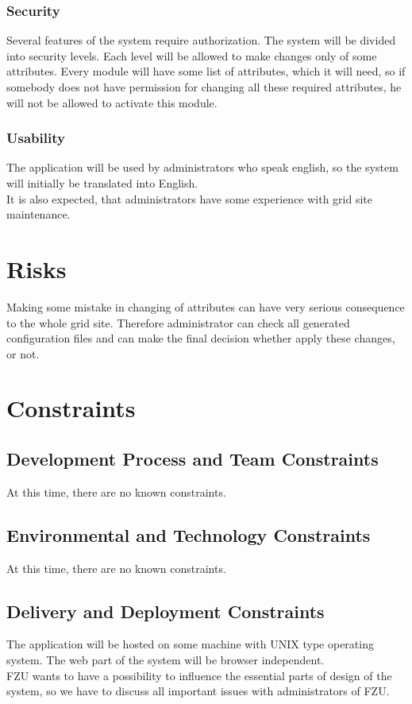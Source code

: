 \documentclass[12pt]{article}
\begin{document}
\subsubsection{Security}
Several features of the system require authorization. The system will be divided into security levels. Each level will be allowed 
to make changes only of some attributes. Every module will have some list of attributes, which it will need, so if somebody 
does not have permission for changing all these required attributes, he will not be allowed to activate this module.

\subsubsection{Usability}
The application will be used by administrators who speak english, so the system will initially be translated into English.\\
It is also expected, that administrators have some experience with grid site maintenance.


\section{Risks}
Making some mistake in changing of attributes can have very serious consequence to the whole grid site. Therefore administrator can
check all generated configuration files and can make the final decision whether apply these changes, or not.


\section{Constraints}

\subsection{Development Process and Team Constraints}
At this time, there are no known constraints.

\subsection{Environmental and Technology Constraints}
At this time, there are no known constraints.

\subsection{Delivery and Deployment Constraints}
The application will be hosted on some machine with UNIX type operating system. The web part of the system will be browser 
independent.\\
FZU wants to have a possibility to influence the essential parts of design of the system, so we have to discuss all important issues
with administrators of FZU.
\end{document}
